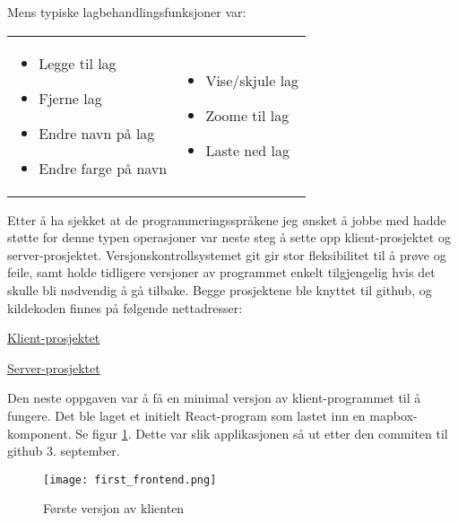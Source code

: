 Mens typiske lagbehandlingsfunksjoner var:

\begin{frame}

    \begin{tabular}{p{}p{}}

        \begin{itemize}
            \item Legge til lag
            \item Fjerne lag
            \item Endre navn på lag
            \item Endre farge på navn
        \end{itemize} &

        \begin{itemize}
            \item Vise/skjule lag
            \item Zoome til lag
            \item Laste ned lag
        \end{itemize}
    \end{tabular}

\end{frame}

Etter å ha sjekket at de programmeringsspråkene jeg ønsket å jobbe med hadde støtte for denne typen operasjoner var neste steg å sette opp klient-prosjektet og server-prosjektet. Versjonskontrollsystemet git gir stor fleksibilitet til å prøve og feile, samt holde tidligere versjoner av programmet enkelt tilgjengelig hvis det skulle bli nødvendig å gå tilbake. Begge prosjektene ble knyttet til github, og kildekoden finnes på følgende nettadresser:

\href{https://github.com/torsol/PiG-frontend}{Klient-prosjektet}

\href{https://github.com/torsol/PiG-backend}{Server-prosjektet}

Den neste oppgaven var å få en minimal versjon av klient-programmet til å fungere. Det ble laget et initielt React-program som lastet inn en mapbox-komponent. Se figur \ref{fig:firstmap}. Dette var slik applikasjonen så ut etter den commiten til github 3. september.

\begin{figure}[h]
    \center
    \texttt{[image: first\_frontend.png]}
    \caption{Første versjon av klienten}
    \label{fig:firstmap}
\end{figure}


